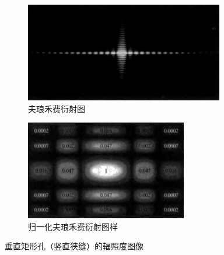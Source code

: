 \documentclass[UTF8]{report}
\theoremstyle{MyLineTheoremStyle} %
\theoremstyle{MyBlockTheoremStyle} %
\theoremstyle{MySubsubsectionStyle} %
\begin{document}
\begin{figure}[H]\centering
\begin{subfigure}[b]{0.56\columnwidth}\centering
    \includegraphics[height=123pt]{assets/4/4.3 矩形孔辐照度分布 4.png}
    \caption{夫琅禾费衍射图}
\end{subfigure}\hfill
\begin{subfigure}[b]{0.44\columnwidth}\centering
    \includegraphics[height=123pt]{assets/4/4.3 矩形孔辐照度分布 5.png}
    \caption{归一化夫琅禾费衍射图样}
\end{subfigure}
\caption{垂直矩形孔（竖直狭缝）的辐照度图像}
\end{figure}
\end{document}
